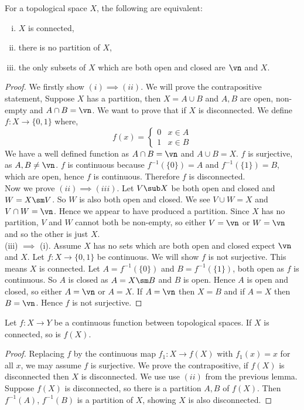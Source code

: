 \begin{nlemma}
  For a topological space $X$, the following are equivalent:
  \begin{enumerate}[(i)]
    \item $X$ is connected,
    \item there is no partition of $X$,
    \item the only subsets of $X$ which are both open and closed are $\vn$ and $X$.
  \end{enumerate}
\end{nlemma}
\begin{proof}
  We firstly show $(i)\implies (ii)$. We will prove the contrapositive statement, Suppose $X$ has a partition, then $X = A \cup B$ and $A, B$ are open, non-empty and $A \cap B = \vn$. We want to prove that if $X$ is disconnected. We define $f : X \to \{0, 1\}$ where,
  $$ f(x) = \begin{cases}
    0 & x \in A \\
    1 & x \in B
  \end{cases} $$
  We have a well defined function as $A \cap B = \vn$ and $A \cup B = X$. $f$ is surjective, as $A, B \ne \vn$. $f$ is continuous because $f^{-1}(\{0\}) = A$ and $f^{-1}(\{1\}) = B$, which are open, hence $f$ is continuous. Therefore $f$ is disconnected.\\

  \noindent
  Now we prove $(ii) \implies (iii)$. Let $V \sub X$ be both open and closed and $W = X \sm V$. So $W$ is also both open and closed. We see $V \cup W = X$ and $V \cap W = \vn$. Hence we appear to have produced a partition. Since $X$ has no partition, $V$ and $W$ cannot both be non-empty, so either $V = \vn$ or $W = \vn$ and so the other is just $X$. \\

  \noindent
  (iii) $\implies$ (i). Assume $X$ has no sets which are both open and closed expect $\vn$ and $X$. Let $f : X \to \{0, 1\}$ be continuous. We will show $f$ is not surjective. This means $X$ is connected. Let $A = f^{-1}(\{0\})$ and $B = f^{-1}(\{1\})$, both open as $f$ is continuous. So $A$ is closed as $A = X \sm B$ and $B$ is open. Hence $A$ is open and closed, so either $A = \vn$ or $A = X$. If $A = \vn$ then $X = B$
  and if $A = X$ then $B = \vn$. Hence $f$ is not surjective.
\end{proof}

\begin{nlemma}
  Let $f : X \to Y$ be a continuous function between topological spaces. If $X$ is connected, so is $f(X)$.
\end{nlemma}
\begin{proof}
  Replacing $f$ by the continuous map $f_1 : X \to f(X)$ with $f_1(x) = x$ for all $x$, we may assume $f$ is surjective. We prove the contrapositive, if $f(X)$ is disconnected then $X$ is disconnected. We use use $(ii)$ from the previous lemma.  Suppose $f(X)$ is disconnected, so there is a partition $A, B$ of $f(X)$. Then $f^{-1}(A)$, $f^{-1}(B)$ is a partition of $X$, showing $X$ is also disconnected.
\end{proof}

